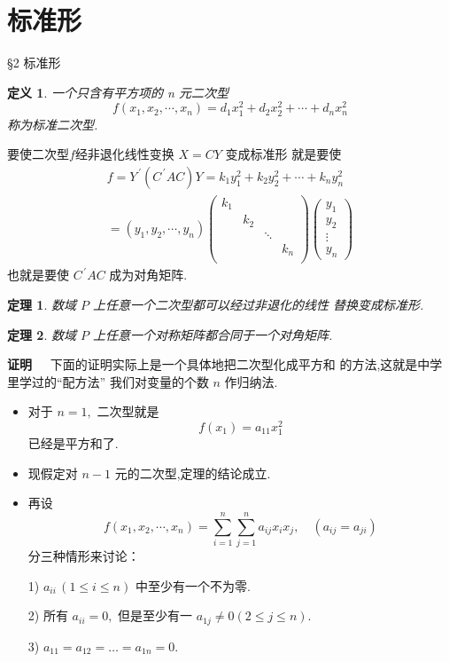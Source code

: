 \documentclass[13pt]{beamer}
\newtheorem{thm}{定理}
\newtheorem*{defi}{定义}
\def\pf{{\bf 证明~~ }}
\begin{document}
\section{标准形}
\begin{frame}{\S 2  标准形}
\begin{defi}
	一个只含有平方项的 n 元二次型
	\[
	f\left(x_{1}, x_{2}, \cdots, x_{n}\right)=d_{1} x_{1}^{2}+d_{2} x_{2}^{2}+\cdots+d_{n} x_{n}^{2}
	\]
	称为\alert{标准二次型}.
\end{defi}

要使二次型$f$经非退化线性变换 $X=C Y$ 变成标准形 就是要使
\[
\begin{array}{l}
f=Y^{\, \prime}\left(C^{\, \prime} A C\right) Y=k_{1} y_{1}^{2}+k_{2} y_{2}^{2}+\cdots+k_{n} y_{n}^{2} \\
=\left(y_{1}, y_{2}, \cdots, y_{n}\right)\left(\begin{array}{cccc}
k_{1} & &&\\
&k_{2} &&\\
& & \ddots &\\
& &&k_{n}\\
\end{array}\right)\left(\begin{array}{c}
y_{1} \\
y_{2} \\
\vdots \\
y_{n}
\end{array}\right)
\end{array}
\]
也就是要使 $C^{\, \prime} A C$ 成为对角矩阵.
\end{frame}

\begin{frame}
\begin{thm}
数域 $P$ 上任意一个二次型都可以经过非退化的线性 替换变成标准形.
\end{thm}

\begin{thm}
数域 $P$ 上任意一个对称矩阵都合同于一个对角矩阵. 
\end{thm}

\end{frame}

\begin{frame}
\pf 下面的证明实际上是一个具体地把二次型化成平方和 的方法,这就是中学里学过的“配方法” 我们对变量的个数 $n$ 作归纳法. 
\begin{itemize}
\item 对于 $n=1,$ 二次型就是
\[
f\left(x_{1}\right)=a_{11} x_{1}^{2}
\]
已经是平方和了.
\item  现假定对 $n-1$ 元的二次型,定理的结论成立.  
\item 再设 \[
f\left(x_{1}, x_{2}, \cdots, x_{n}\right)=\sum_{i=1}^{n} \sum_{j=1}^{n} a_{i j} x_{i} x_j, \quad\left(a_{i j}=a_{j i}\right)
\]
分三种情形来讨论：

1) $a_{i i}\, (1 \le i\le n)$ 中至少有一个不为零.

2) 所有 $a_{i i}=0,$ 但是至少有一 $a_{1 j} \neq 0(2 \le j \le n)$.

3) $a_{11}=a_{12}=\dots=a_{1 n}=0$.
\end{itemize}
\end{frame}
\end{document}
